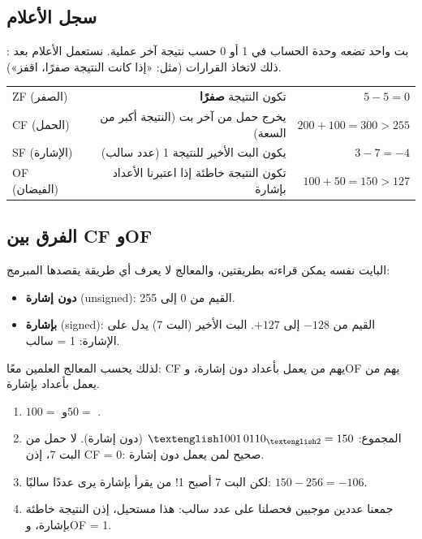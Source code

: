 \subsection{سجل الأعلام}
\begin{tarif}
    : بت واحد تضعه وحدة الحساب في 1 أو 0 حسب
    نتيجة آخر عملية. نستعمل الأعلام بعد ذلك لاتخاذ القرارات (مثل: «إذا كانت النتيجة صفرًا، اقفز»).
\end{tarif}

\begin{center}
\begin{tabularx}{\linewidth}{|>{\centering\arraybackslash}p{2.6cm}|R|R|}
    \hline
     &  &  \\ \hline
    \textenglish{ZF} (الصفر) & تكون النتيجة \textbf{صفرًا} & $5 - 5 = 0$ \\ \hline
    \textenglish{CF} (الحمل) & يخرج حمل من آخر بت (النتيجة أكبر من السعة) & $200 + 100 = 300 > 255$ \\ \hline
    \textenglish{SF} (الإشارة) & يكون البت الأخير للنتيجة 1 (عدد سالب) & $3 - 7 = -4$ \\ \hline
    \textenglish{OF} (الفيضان) & تكون النتيجة خاطئة إذا اعتبرنا الأعداد بإشارة & $100 + 50 = 150 > 127$ \\ \hline
\end{tabularx}
\end{center}

\subsection{الفرق بين \textenglish{CF} و\textenglish{OF}}
البايت نفسه يمكن قراءته بطريقتين، والمعالج لا يعرف أي طريقة يقصدها المبرمج:
\begin{itemize}
    \item \textbf{دون إشارة} \textenglish{(unsigned)}: القيم من 0 إلى 255.
    \item \textbf{بإشارة} \textenglish{(signed)}: القيم من $-128$ إلى $+127$. البت الأخير (البت 7) يدل على الإشارة: 1 = سالب.
\end{itemize}
لذلك يحسب المعالج العلمين معًا: \textenglish{CF} يهم من يعمل بأعداد دون إشارة، و\textenglish{OF} يهم من يعمل
بأعداد بإشارة.

\begin{khatwa}
    \begin{enumerate}
        \item $100 = $  و$50 = $ .
        \item المجموع: $\bin{1001\,0110} = 150$ (دون إشارة). لا حمل من البت 7، إذن \textenglish{CF = 0}: صحيح لمن يعمل دون إشارة.
        \item لكن البت 7 أصبح 1! من يقرأ بإشارة يرى عددًا سالبًا: $150 - 256 = -106$.
        \item جمعنا عددين موجبين فحصلنا على عدد سالب: هذا مستحيل، إذن النتيجة خاطئة بإشارة، و\textenglish{OF = 1}.
    \end{enumerate}
\end{khatwa}


